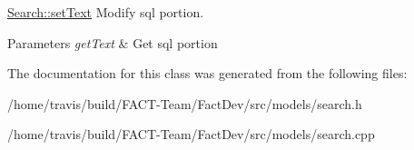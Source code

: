 \hyperlink{classModels_1_1Search_a1bd00e3da5d5e10b4bec6579fb1c8bfa}{Search\-::set\-Text} Modify sql portion. 


\begin{DoxyParams}{Parameters}
{\em get\-Text} & Get sql portion \\
\hline
\end{DoxyParams}


The documentation for this class was generated from the following files\-:\begin{DoxyCompactItemize}
\item 
/home/travis/build/\-F\-A\-C\-T-\/\-Team/\-Fact\-Dev/src/models/search.\-h\item 
/home/travis/build/\-F\-A\-C\-T-\/\-Team/\-Fact\-Dev/src/models/search.\-cpp\end{DoxyCompactItemize}
